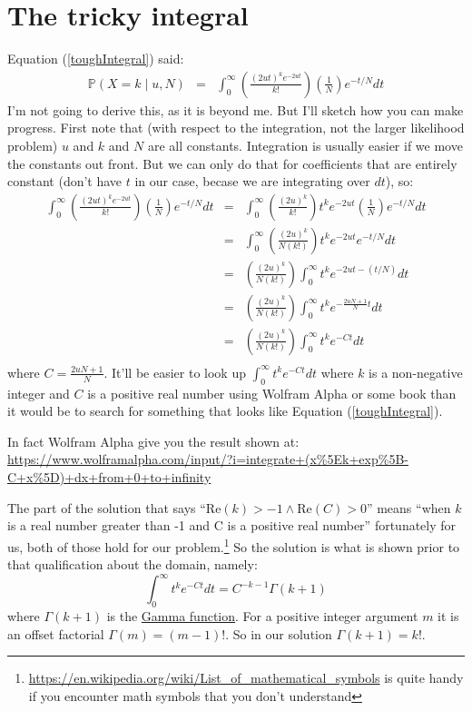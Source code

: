\documentclass[11pt]{article}
\renewcommand{\Pr}{\mathbb{P}}
\newcommand{\href}[2]{\url{#2}}
\begin{document}
\section{The tricky integral}
\label{deriveTheta}
Equation (\ref{toughIntegral}) said:
\begin{eqnarray*}\Pr(X=k \mid u, N) & = & \int_{0}^{\infty} \left(\frac{(2ut)^k e^{-2ut}}{k!} \right)\left(\frac{1}{N}\right) e^{-t/N}dt
\end{eqnarray*}
I'm not going to derive this, as it is beyond me.
But I'll sketch how you can make progress.
First note that (with respect to the integration, not the larger likelihood problem)
$u$ and $k$ and $N$ are all constants.
Integration is usually easier if we move the constants out front.
But we can only do that for coefficients that are entirely constant (don't have $t$ 
in our case, becase we are integrating over $dt$), so:
\begin{eqnarray*}
\int_{0}^{\infty} \left(\frac{(2ut)^k e^{-2ut}}{k!} \right)\left(\frac{1}{N}\right) e^{-t/N}dt 
& = & \int_{0}^{\infty} \left(\frac{(2u)^k}{k!}\right) t^ke^{-2ut} \left(\frac{1}{N}\right) e^{-t/N} dt \\
& = & \int_{0}^{\infty} \left(\frac{(2u)^k}{N(k!)}\right) t^ke^{-2ut} e^{-t/N} dt \\
& = & \left(\frac{(2u)^k}{N(k!)}\right) \int_{0}^{\infty}  t^ke^{-2ut - (t/N)} dt \\
& = & \left(\frac{(2u)^k}{N(k!)}\right) \int_{0}^{\infty}  t^ke^{-\frac{2uN + 1}{N} t} dt \\
& = & \left(\frac{(2u)^k}{N(k!)}\right) \int_{0}^{\infty}  t^ke^{-C t} dt \\
\end{eqnarray*}
where $C=\frac{2uN + 1}{N}$.
It'll be easier to look up $ \int_{0}^{\infty}  t^ke^{-C t} dt$ where $k$ is a non-negative
integer and $C$ is a positive real number using Wolfram Alpha or some book than it would be
to search for something that looks like Equation (\ref{toughIntegral}).

In fact Wolfram Alpha give you the result shown at:
\url{https://www.wolframalpha.com/input/?i=integrate+(x%5Ek+exp%5B-C+x%5D)+dx+from+0+to+infinity}

The part of the solution that says ``$\mbox{Re}(k) > - 1 \land \mbox{Re}(C) > 0$''
means ``when $k$ is a real number greater than -1 and C is a positive real number''
fortunately for us, both of those hold for our problem.\footnote{\url{https://en.wikipedia.org/wiki/List_of_mathematical_symbols} is quite handy if you encounter math symbols that you don't understand}
So the solution is what is shown prior to that qualification about the domain, namely:
$$ \int_{0}^{\infty}  t^ke^{-C t} dt = C^{-k-1}\Gamma(k+1)$$
where $\Gamma(k+1)$ is the \href{https://en.wikipedia.org/wiki/Gamma_function}{Gamma function}.
For a positive integer argument $m$ it is an offset factorial $\Gamma(m) = (m-1)!$.
So in our solution $\Gamma(k+1) = k!$.
\end{document}

